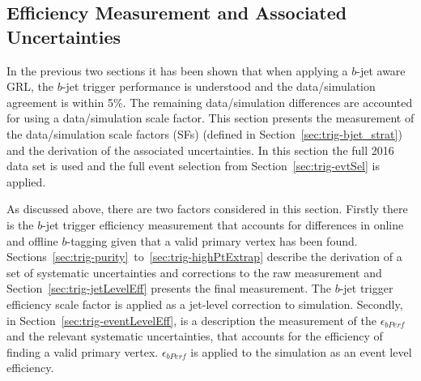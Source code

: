 \FloatBarrier
\newpage

\subsection{Efficiency Measurement and Associated Uncertainties}
\label{sec:trig-eff_syst}

In the previous two sections it has been shown that when applying a $b$-jet aware GRL,
the $b$-jet trigger performance is understood and the data/simulation agreement is within 5\%.
The remaining data/simulation differences are accounted for using a data/simulation scale factor.
This section presents the measurement of the data/simulation scale factors (SFs) (defined in Section~\ref{sec:trig-bjet_strat})
and the derivation of the associated uncertainties.
In this section the full 2016 data set is used
and the full event selection from Section~\ref{sec:trig-evtSel} is applied.

As discussed above, there are two factors considered in this section.
Firstly there is the $b$-jet trigger efficiency measurement
that accounts for differences in online and offline $b$-tagging given that a valid primary vertex has been found.
Sections~\ref{sec:trig-purity}~to~\ref{sec:trig-highPtExtrap} describe the derivation of a set of systematic uncertainties and corrections to the raw measurement
and Section~\ref{sec:trig-jetLevelEff} presents the final measurement.
The $b$-jet trigger efficiency scale factor is applied as a jet-level correction to simulation.
Secondly, in Section~\ref{sec:trig-eventLevelEff}, is a description the measurement of the $\epsilon_{bPerf}$ and the relevant systematic uncertainties,
that accounts for the efficiency of finding a valid primary vertex.
$\epsilon_{bPerf}$ is applied to the simulation as an event level efficiency.



